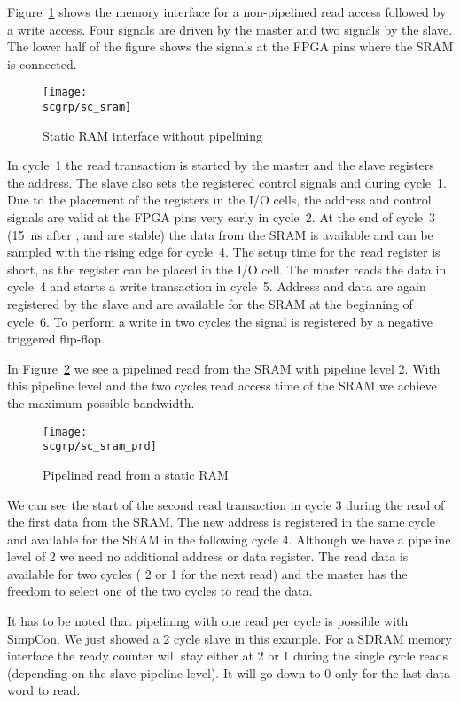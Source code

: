 Figure~\ref{fig:sc:sram} shows the memory interface for a
non-pipelined read access followed by a write access. Four signals
are driven by the master and two signals by the slave. The lower half
of the figure shows the signals at the FPGA pins where the SRAM is
connected.


\begin{figure}
    \centering
    \texttt{[image: \\scgrp/sc\_sram]}
    \caption{Static RAM interface without pipelining}
    \label{fig:sc:sram}
\end{figure}

In cycle~1 the read transaction is started by the master and the
slave registers the address. The slave also sets the registered
control signals  and  during cycle~1. Due to the
placement of the registers in the I/O cells, the address and control
signals are valid at the FPGA pins very early in cycle~2. At the end
of cycle~3 (15~ns after ,  and  are
stable) the data from the SRAM is available and can be sampled with
the rising edge for cycle~4. The setup time for the read register is
short, as the register can be placed in the I/O cell. The master
reads the data in cycle~4 and starts a write transaction in cycle~5.
Address and data are again registered by the slave and are available
for the SRAM at the beginning of cycle~6. To perform a write in two
cycles the  signal is registered by a negative triggered
flip-flop.

In Figure~\ref{fig:sc:sram:prd} we see a pipelined read from the SRAM
with pipeline level 2. With this pipeline level and the two cycles
read access time of the SRAM we achieve the maximum possible
bandwidth.

\begin{figure}
    \centering
    \texttt{[image: \\scgrp/sc\_sram\_prd]}
    \caption{Pipelined read from a static RAM}
    \label{fig:sc:sram:prd}
\end{figure}

We can see the start of the second read transaction in cycle 3 during
the read of the first data from the SRAM. The new address is
registered in the same cycle and available for the SRAM in the
following cycle 4. Although we have a pipeline level of 2 we need no
additional address or data register. The read data is available for
two cycles ( 2 or 1 for the next read) and the master
has the freedom to select one of the two cycles to read the data.

It has to be noted that pipelining with one read per cycle is
possible with SimpCon. We just showed a 2 cycle slave in this
example. For a SDRAM memory interface the ready counter will stay
either at 2 or 1 during the single cycle reads (depending on the
slave pipeline level). It will go down to 0 only for the last data
word to read.


